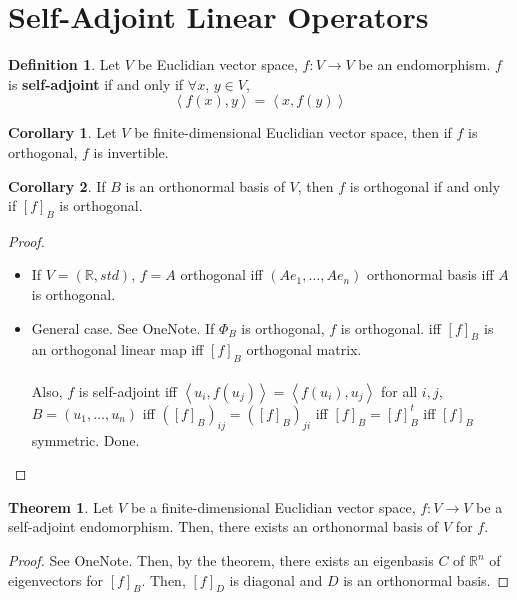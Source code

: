 \documentclass[letterpaper,12pt]{article}
\theoremstyle{definition}
\newtheorem*{definition}{Definition}
\newtheorem*{theorem}{Theorem}
\newtheorem*{corollary}{Corollary}
\newcommand{\inp}[2]{\left< #1, #2 \right>}
\begin{document}
\section*{Self-Adjoint Linear Operators}
\begin{definition}
Let $V$ be Euclidian vector space, $f: V \rightarrow V$ be an endomorphism. $f$ is \textbf{self-adjoint} if and only if $\forall x$, $y \in V$,
\begin{equation*}
    \inp{f(x)}{y} = \inp{x}{f(y)}
\end{equation*}
\end{definition}

\begin{corollary}
Let $V$ be finite-dimensional Euclidian vector space, then if $f$ is orthogonal, $f$ is invertible.
\end{corollary}

\begin{corollary}
If $B$ is an orthonormal basis of $V$, then $f$ is orthogonal if and only if $[f]_{B}$ is orthogonal.
\end{corollary}
\begin{proof}
\begin{itemize}
    \item If $V = (\mathbb{R}, std)$, $f = A$ orthogonal iff $(Ae_1, \dots, Ae_n)$ orthonormal basis iff $A$ is orthogonal.
    \item General case. See OneNote. If $\Phi_{B}$ is orthogonal, $f$ is orthogonal. iff $[f]_{B}$ is an orthogonal linear map iff $[f]_{B}$ orthogonal matrix.
    \\ \\ Also, $f$ is self-adjoint iff $\inp{u_i}{f(u_j)} = \inp{f(u_i)}{u_j}$ for all $i,j$, $B = (u_1, \dots, u_n)$ iff $([f]_{B})_{ij} = ([f]_{B})_{ji}$ iff $[f]_{B} = [f]_{B}^{t}$ iff $[f]_{B}$ symmetric. Done.
\end{itemize}
\end{proof}

\begin{theorem}
Let $V$ be a finite-dimensional Euclidian vector space, $f: V \rightarrow V$ be a self-adjoint endomorphism. Then, there exists an orthonormal basis of $V$ for $f$.
\end{theorem}
\begin{proof}
See OneNote. Then, by the theorem, there exists an eigenbasis $C$ of $\mathbb{R}^n$ of eigenvectors for $[f]_{B}$. Then, $[f]_{D}$ is diagonal and $D$ is an orthonormal basis.
\end{proof}
\end{document}
